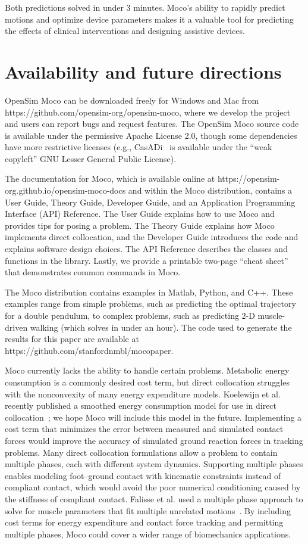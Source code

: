 \documentclass[10pt,letterpaper]{article}
\begin{document}
Both predictions solved in under 3 minutes. Moco’s ability to rapidly predict motions and optimize device parameters makes it a valuable tool for predicting the effects of clinical interventions and designing assistive devices.


\section*{Availability and future directions}

OpenSim Moco can be downloaded freely for Windows and Mac from https://github.com/opensim-org/opensim-moco, where we develop the project and users can report bugs and request features. The OpenSim Moco source code is available under the permissive Apache License 2.0, though some dependencies have more restrictive licenses (e.g., CasADi~\cite{Andersson:2019} is available under the “weak copyleft” GNU Lesser General Public License).

The documentation for Moco, which is available online at https://opensim-org.github.io/opensim-moco-docs and within the Moco distribution, contains a User Guide, Theory Guide, Developer Guide, and an Application Programming Interface (API) Reference. The User Guide explains how to use Moco and provides tips for posing a problem. The Theory Guide explains how Moco implements direct collocation, and the Developer Guide introduces the code and explains software design choices. The API Reference describes the classes and functions in the library. Lastly, we provide a printable two-page “cheat sheet” that demonstrates common commands in Moco.

The Moco distribution contains examples in Matlab, Python, and C++. These examples range from simple problems, such as predicting the optimal trajectory for a double pendulum, to complex problems, such as predicting 2-D muscle-driven walking (which solves in under an hour). The code used to generate the results for this paper are available at https://github.com/stanfordnmbl/mocopaper.

Moco currently lacks the ability to handle certain problems. Metabolic energy consumption is a commonly desired cost term, but direct collocation struggles with the nonconvexity of many energy expenditure models. Koelewijn et al. recently published a smoothed energy consumption model for use in direct collocation~\cite{Koelewijn:2019}; we hope Moco will include this model in the future. Implementing a cost term that minimizes the error between measured and simulated contact forces would improve the accuracy of simulated ground reaction forces in tracking problems. Many direct collocation formulations allow a problem to contain multiple phases, each with different system dynamics. Supporting multiple phases enables modeling foot–ground contact with kinematic constraints instead of compliant contact, which would avoid the poor numerical conditioning caused by the stiffness of compliant contact. Falisse et al. used a multiple phase approach to solve for muscle parameters that fit multiple unrelated motions~\cite{Falisse:2016}. By including cost terms for energy expenditure and contact force tracking and permitting multiple phases, Moco could cover a wider range of biomechanics applications.
\end{document}
